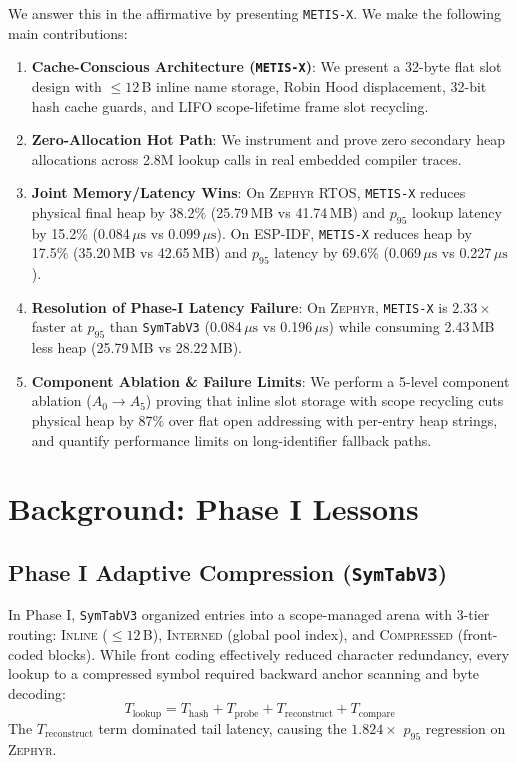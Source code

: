 \documentclass[conference]{IEEEtran}
\begin{document}
We answer this in the affirmative by presenting \texttt{METIS-X}. We make the following main contributions:
\begin{enumerate}
    \item \textbf{Cache-Conscious Architecture (\texttt{METIS-X})}: We present a 32-byte flat slot design with $\le 12$\,B inline name storage, Robin Hood displacement, 32-bit hash cache guards, and LIFO scope-lifetime frame slot recycling.
    \item \textbf{Zero-Allocation Hot Path}: We instrument and prove zero secondary heap allocations across 2.8M lookup calls in real embedded compiler traces.
    \item \textbf{Joint Memory/Latency Wins}: On \textsc{Zephyr} RTOS, \texttt{METIS-X} reduces physical final heap by 38.2\% (25.79\,MB vs 41.74\,MB) and $p_{95}$ lookup latency by 15.2\% (0.084\,$\mu\text{s}$ vs 0.099\,$\mu\text{s}$). On \textsc{ESP-IDF}, \texttt{METIS-X} reduces heap by 17.5\% (35.20\,MB vs 42.65\,MB) and $p_{95}$ latency by 69.6\% (0.069\,$\mu\text{s}$ vs 0.227\,$\mu\text{s}$).
    \item \textbf{Resolution of Phase-I Latency Failure}: On \textsc{Zephyr}, \texttt{METIS-X} is $2.33\times$ faster at $p_{95}$ than \texttt{SymTabV3} (0.084\,$\mu\text{s}$ vs 0.196\,$\mu\text{s}$) while consuming 2.43\,MB less heap (25.79\,MB vs 28.22\,MB).
    \item \textbf{Component Ablation \& Failure Limits}: We perform a 5-level component ablation ($A_0 \to A_5$) proving that inline slot storage with scope recycling cuts physical heap by 87\% over flat open addressing with per-entry heap strings, and quantify performance limits on long-identifier fallback paths.
\end{enumerate}

\section{Background: Phase I Lessons}

\subsection{Phase I Adaptive Compression (\texttt{SymTabV3})}
In Phase I, \texttt{SymTabV3} organized entries into a scope-managed arena with 3-tier routing: \textsc{Inline} ($\le 12$\,B), \textsc{Interned} (global pool index), and \textsc{Compressed} (front-coded blocks). While front coding effectively reduced character redundancy, every lookup to a compressed symbol required backward anchor scanning and byte decoding:
\begin{equation}
T_{\text{lookup}} = T_{\text{hash}} + T_{\text{probe}} + T_{\text{reconstruct}} + T_{\text{compare}}
\end{equation}
The $T_{\text{reconstruct}}$ term dominated tail latency, causing the $1.824\times$ $p_{95}$ regression on \textsc{Zephyr}.
\end{document}
